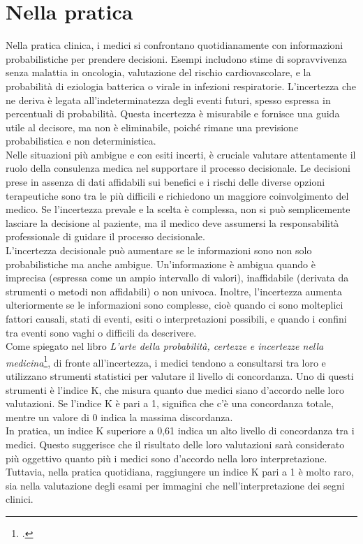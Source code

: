 \section{Nella pratica}
Nella pratica clinica, i medici si confrontano quotidianamente con informazioni probabilistiche per prendere decisioni. Esempi includono stime di sopravvivenza senza malattia in oncologia, valutazione del rischio cardiovascolare, e la probabilità di eziologia batterica o virale in infezioni respiratorie. L'incertezza che ne deriva è legata all'indeterminatezza degli eventi futuri, spesso espressa in percentuali di probabilità. Questa incertezza è misurabile e fornisce una guida utile al decisore, ma non è eliminabile, poiché rimane una previsione probabilistica e non deterministica.\\
Nelle situazioni più ambigue e con esiti incerti, è cruciale valutare attentamente il ruolo della consulenza medica nel supportare il processo decisionale. Le decisioni prese in assenza di dati affidabili sui benefici e i rischi delle diverse opzioni terapeutiche sono tra le più difficili e richiedono un maggiore coinvolgimento del medico. Se l'incertezza prevale e la scelta è complessa, non si può semplicemente lasciare la decisione al paziente, ma il medico deve assumersi la responsabilità professionale di guidare il processo decisionale.\\

L'incertezza decisionale può aumentare se le informazioni sono non solo probabilistiche ma anche ambigue. Un'informazione è ambigua quando è imprecisa (espressa come un ampio intervallo di valori), inaffidabile (derivata da strumenti o metodi non affidabili) o non univoca. Inoltre, l'incertezza aumenta ulteriormente se le informazioni sono complesse, cioè quando ci sono molteplici fattori causali, stati di eventi, esiti o interpretazioni possibili, e quando i confini tra eventi sono vaghi o difficili da descrivere.\\

Come spiegato nel libro \textit{L'arte della probabilità, certezze e incertezze nella medicina}\footcite{womak:arte-probabilita-coen}, di fronte all'incertezza, i medici tendono a consultarsi tra loro e utilizzano strumenti statistici per valutare il livello di concordanza. Uno di questi strumenti è l'indice K, che misura quanto due medici siano d'accordo nelle loro valutazioni. Se l'indice K è pari a 1, significa che c'è una concordanza totale, mentre un valore di 0 indica la massima discordanza. \\
In pratica, un indice K superiore a 0,61 indica un alto livello di concordanza tra i medici. Questo suggerisce che il risultato delle loro valutazioni sarà considerato più oggettivo quanto più i medici sono d'accordo nella loro interpretazione. Tuttavia, nella pratica quotidiana, raggiungere un indice K pari a 1 è molto raro, sia nella valutazione degli esami per immagini che nell'interpretazione dei segni clinici.


